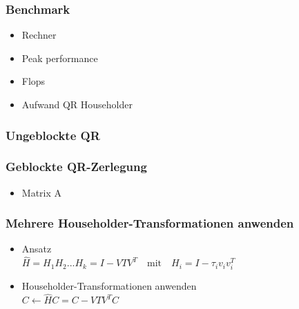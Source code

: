 \begin{frame}
	\frametitle{Benchmark}
	\begin{itemize}
		\item Rechner
		\item Peak performance
		\item Flops
		\item Aufwand QR Householder
	\end{itemize}
\end{frame}

\begin{frame}
	\frametitle{Ungeblockte QR}
	\centering
\end{frame}

\begin{frame}
	\frametitle{Geblockte QR-Zerlegung}
	\begin{itemize}
		\item Matrix A\\
		\centering
		
	\end{itemize}
\end{frame}

\begin{frame}
	\frametitle{Mehrere Householder-Transformationen anwenden}	
	\vspace{-1cm}	
		\begin{itemize}
			\item Ansatz\\
			\vspace{0.3cm}
			$\hat{H} = H_1H_2...H_k = I - VTV^T \quad \text{mit}\quad H_i = I - \tau_i v_iv_i^T $
			\vspace{0.3cm}
			\item Householder-Transformationen anwenden\\
			\vspace{0.3cm}
			$ C \leftarrow \hat{H} C = C - V T V^T C \quad $
			
		\end{itemize}

		\vspace{-3cm}
		\hspace{9.5cm}
		\centering
		
\end{frame}




